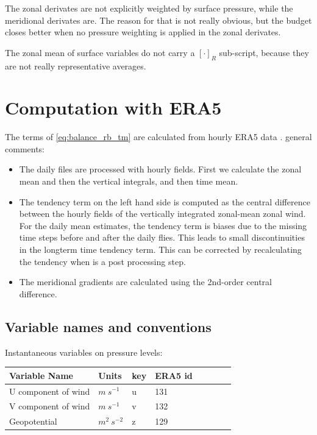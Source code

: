 \documentclass[11pt]{article}
\numberwithin{equation}{section}
\begin{document}
The zonal derivates are not explicitly weighted by surface pressure, while the meridional derivates are. The reason for that is not really obvious, but the budget closes better when no pressure weighting is applied in the zonal derivates.\par
The zonal mean of surface variables do not carry a $[\cdot]_R$ sub-script, because they are not really representative averages.


\section{Computation with ERA5}
The terms of \eqref{eq:balance_rb_tm} are calculated from hourly ERA5 data \citep{EuropeanCentreForMedium-RangeWeatherForecasts2017}. general comments:

\begin{itemize}

\item The daily files are processed with hourly fields. First we calculate the zonal mean and then the vertical integrals, and then time mean.

\item The tendency term on the left hand side is computed as the central difference between the hourly fields of the vertically integrated zonal-mean zonal wind. For the daily mean estimates, the tendency term is biases due to the missing time steps before and after the daily flies. This leads to small discontinuities in the longterm time tendency term. This can be corrected by recalculating the tendency when is a post processing step.
\item The meridional gradients are calculated using the 2nd-order central difference.
\end{itemize}


\subsection{Variable names and conventions}

Instantaneous variables on pressure levels:
\begin{table}[h!]
\label{table:pressure_var}
\begin{center}
    \begin{tabular}{ | l | l | l | l | l | l | l | l |}
    \hline
    Variable Name & Units & key & ERA5 id \\ \hline
     U component of wind & $m~s^{-1}$   & u    &  131  \\ \hline
     V component of wind & $m~s^{-1}$   & v    &  132\\ \hline
     Geopotential & $m^2~s^{-2}$   & z    &  129\\ \hline
        \end{tabular}
\end{center}
\end{table}
\end{document}
